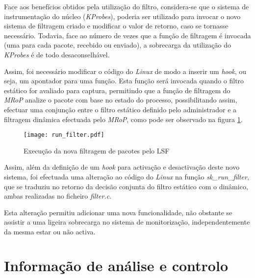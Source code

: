 Face aos benefícios obtidos pela utilização do filtro, considera-se que o sistema de instrumentação do núcleo (\textit{KProbes}), poderia ser utilizado para invocar o novo sistema de filtragem criado e modificar o valor de retorno, caso se tornasse necessário.
Todavia, face ao número de vezes que a função de filtragem é invocada (uma para cada pacote, recebido ou enviado), a sobrecarga da utilização do \textit{KProbes} é de todo desaconselhável.

Assim, foi necessário modificar o código do \textit{Linux} de modo a inserir um \textit{hook}, ou seja, um apontador para uma função.
Esta função será invocada quando o filtro estático for avaliado para captura, permitindo que a função de filtragem do \textit{MRoP} analize o pacote com base no estado do processo, possibilitando assim, efectuar uma conjunção entre o filtro estático definido pelo administrador e a filtragem dinâmica efectuada pelo \textit{MRoP}, como pode ser observado na figura \ref{fig:run_filter}.

\begin{figure}[!ht]
\centering
\texttt{[image: run\_filter.pdf]}
\caption{Execução da nova filtragem de pacotes pelo LSF}
\label{fig:run_filter}
\end{figure}

Assim, além da definição de um \textit{hook} para activação e desactivação deste novo sistema, foi efectuada uma alteração ao código do \textit{Linux} na função \textit{sk\_run\_filter}, que se traduziu no retorno da decisão conjunta do filtro estático com o dinâmico, ambas realizadas no ficheiro \textit{filter.c}.

Esta alteração permitiu adicionar uma nova funcionalidade, não obstante se assistir a uma ligeira sobrecarga no sistema de monitorização, independentemente da mesma estar ou não activa.



\section{Informação de análise e controlo}


